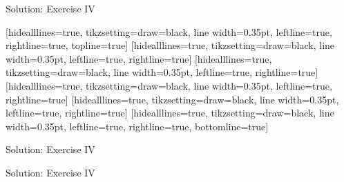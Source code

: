 \begin{frame}{Solution: Exercise IV}
    \begin{listing}[H]
        [hidealllines=true, tikzsetting={draw=black, line width=0.35pt}, leftline=true, rightline=true, topline=true]
        \vspace{-1.25em}
        [hidealllines=true, tikzsetting={draw=black, line width=0.35pt}, leftline=true, rightline=true]
        \vspace{-1.25em}
        [hidealllines=true, tikzsetting={draw=black, line width=0.35pt}, leftline=true, rightline=true]
        \vspace{-1.25em}
        [hidealllines=true, tikzsetting={draw=black, line width=0.35pt}, leftline=true, rightline=true]
        \vspace{-1.25em}
        [hidealllines=true, tikzsetting={draw=black, line width=0.35pt}, leftline=true, rightline=true]
        \vspace{-1.25em}
        [hidealllines=true, tikzsetting={draw=black, line width=0.35pt}, leftline=true, rightline=true, bottomline=true]
        \caption{Solution for Exercise IV.}
        \label{lst:arduino:exercise:4:solution:overview}
    \end{listing}
\end{frame}

\begin{frame}{Solution: Exercise IV}
    \begin{listing}[H]
        \caption{Solution for Exercise IV (\texttt{setup()}).}
        \label{lst:arduino:exercise:4:solution:part:1}
    \end{listing}
\end{frame}

\begin{frame}{Solution: Exercise IV}
    \begin{listing}[H]
        \caption{Solution for Exercise IV (\texttt{printWiFiStatus()}).}
        \label{lst:arduino:exercise:4:solution:part:2}
    \end{listing}
\end{frame}

